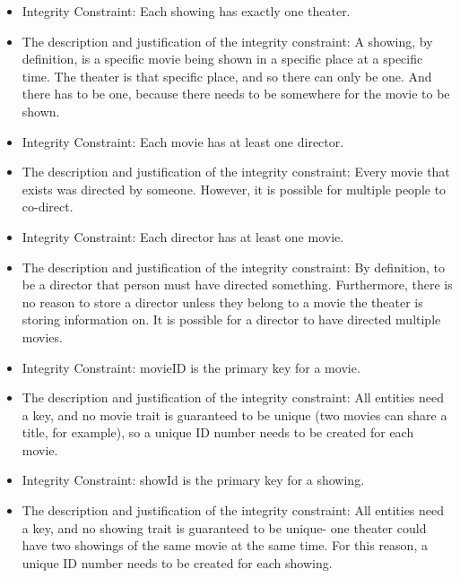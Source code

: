 {\begin{itemize}
\begin{itemize}
\end{itemize}
\begin{itemize} 
\item{ Integrity Constraint: }
Each showing has exactly one theater.
\item{ The description and justification of the integrity constraint: }
 A showing, by definition, is a specific movie being shown in a specific place at a specific time.  The theater is that specific place, and so there can only be one.  And there has to be one, because there needs to be somewhere for the movie to be shown.
\end{itemize}
\begin{itemize} 
\item{ Integrity Constraint: }
Each movie has at least one director.
\item{ The description and justification of the integrity constraint: }
Every movie that exists was directed by someone.  However, it is possible for multiple people to co-direct.
\end{itemize}
\begin{itemize} 
\item{ Integrity Constraint: }
Each director has at least one movie.
\item{ The description and justification of the integrity constraint: }
 By definition, to be a director that person must have directed something.  Furthermore, there is no reason to store a director unless they belong to a movie the theater is storing information on.  It is possible for a director to have directed multiple movies.
\end{itemize}
\begin{itemize} 
\item{ Integrity Constraint: }
movieID is the primary key for a movie.
\item{ The description and justification of the integrity constraint: }
All entities need a key, and no movie trait is guaranteed to be unique (two movies can share a title, for example), so a unique ID number needs to be created for each movie.
\end{itemize}
\begin{itemize} 
\item{ Integrity Constraint: }
showId is the primary key for a showing.
\item{ The description and justification of the integrity constraint: }
All entities need a key, and no showing trait is guaranteed to be unique- one theater could have two showings of the same movie at the same time.  For this reason, a unique ID number needs to be created for each showing.

\end{itemize}
\end{itemize}}
